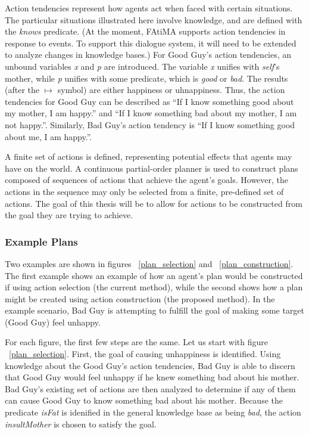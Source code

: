 \documentclass{article}
\begin{document}
Action tendencies represent how agents act when faced with certain
situations.  The particular situations illustrated here involve
knowledge, and are defined with the \emph{knows} predicate.  (At the
moment, FAtiMA supports action tendencies in response to events.  To
support this dialogue system, it will need to be extended to analyze
changes in knowledge bases.)  For Good Guy's action tendencies, an
unbound variables \emph{x} and \emph{p} are introduced.
The variable \emph{x} unifies with \emph{self}'s mother, while \emph{p}
unifies with some predicate, which is \emph{good} or \emph{bad}.
The results (after the $\mapsto$ symbol) are either happiness or uhnappiness.  Thus, the
action tendencies for Good Guy can be described as ``If I know something
good about my mother, I am happy.'' and ``If I know something bad about my mother, I
am not happy.''.  Similarly, Bad Guy's action tendency is ``If I know
something good about me, I am happy.''.

A finite set of actions is defined, representing potential effects
that agents may have on the world.  A continuous partial-order planner
\cite{Paiva2005, Russell2003} is used to construct plans composed of
sequences of actions that achieve the agent's goals.  However, the
actions in the sequence may only be selected from a finite,
pre-defined set of actions.  The goal of this thesis will be to allow
for actions to be constructed from the goal they are trying to achieve.

\subsubsection{Example Plans}

Two examples are shown in figures ~\ref{plan_selection} and ~\ref{plan_construction}.
The first example shows an example of how an agent's plan would be
constructed if using action selection (the current method), while the
second shows how a plan might be created using action construction
(the proposed method).  In the example scenario, Bad Guy is attempting
to fulfill the goal of making some target (Good Guy) feel unhappy.

For each figure, the first few steps are the same.  Let us start with
figure ~\ref{plan_selection}.  First, the goal of causing
unhappiness is identified.  Using knowledge about the Good Guy's
action tendencies, Bad Guy is able to discern that Good Guy would
feel unhappy if he knew something bad about his mother.  Bad Guy's existing
set of actions are then analyzed to determine if any of them can
cause Good Guy to know something bad about his mother.  Because the
predicate \emph{isFat} is idenified in the general knowledge base as
being \emph{bad}, the action \emph{insultMother} is chosen to satisfy the
goal.
\end{document}

